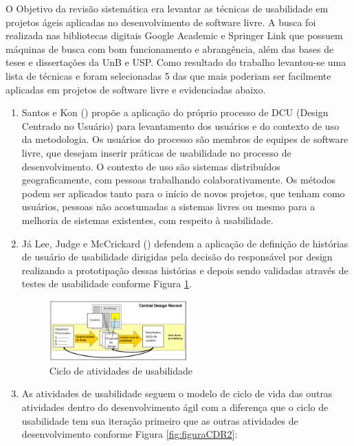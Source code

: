 O Objetivo da revisão sistemática era levantar as técnicas de usabilidade em projetos ágeis aplicadas no desenvolvimento de software livre. A busca foi realizada nas bibliotecas digitais Google Academic e Springer Link que possuem máquinas de busca com bom funcionamento e abrangência, além das bases de teses e dissertações da UnB e USP. Como resultado do trabalho levantou-se uma lista de técnicas e foram selecionadas 5 das que mais poderiam ser facilmente aplicadas em projetos de software livre e evidenciadas abaixo.

\begin{enumerate}
%
\item Santos e Kon (\citeyear{santoskon2009}) propõe a aplicação do próprio processo de DCU (Design Centrado no Usuário) para levantamento dos usuários e do contexto de uso da metodologia. Os usuários do processo são membros de equipes de software livre, que desejam inserir práticas de usabilidade no processo de desenvolvimento. O contexto de uso são sistemas distribuídos geograficamente, com pessoas trabalhando colaborativamente. Os métodos podem ser aplicados tanto para o início de novos projetos, que tenham como usuários, pessoas não acostumadas a sistemas livres ou mesmo para a melhoria de sistemas existentes, com respeito à usabilidade.

%
\item Já Lee, Judge e McCrickard (\citeyear{lee2011}) defendem a aplicação de definição de histórias de usuário de usabilidade dirigidas pela decisão do responsável por design realizando a prototipação dessas histórias e depois sendo validadas através de testes de usabilidade conforme Figura \ref{fig:figuraCDR}.

\begin{figure}[H]
  \begin{center}
    \includegraphics[width=0.5\textwidth]{figuras/figuraCDRBR.eps}
    \caption{Ciclo de atividades de usabilidade}
    \label{fig:figuraCDR}
  \end{center}
\end{figure}

%
\item As atividades de usabilidade seguem o modelo de ciclo de vida das outras atividades dentro do desenvolvimento ágil com a diferença que o ciclo de usabilidade tem sua iteração primeiro que as outras atividades de desenvolvimento conforme Figura \ref{fig:figuraCDR2}:


\end{enumerate}
